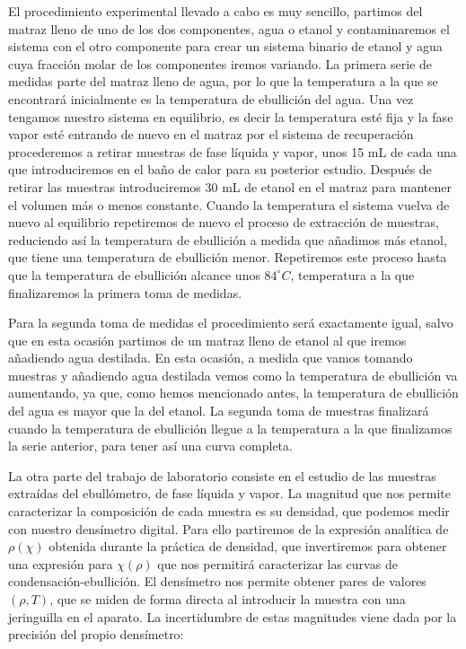 \documentclass[a4paper,12pt,titlepage]{article}
\begin{document}
El procedimiento experimental llevado a cabo es muy sencillo, partimos del matraz lleno de uno de los dos componentes, agua o etanol y contaminaremos el sistema con el otro componente para crear un sistema binario de etanol y agua cuya fracción molar de los componentes iremos variando. La primera serie de medidas parte del matraz lleno de agua, por lo que la temperatura a la que se encontrará inicialmente es la temperatura de ebullición del agua. Una vez tengamos nuestro sistema en equilibrio, es decir la temperatura esté fija y la fase vapor esté entrando de nuevo en el matraz por el sistema de recuperación procederemos a retirar muestras de fase líquida y vapor, unos 15 mL de cada una que introduciremos en el baño de calor para su posterior estudio. Después de retirar las muestras introduciremos 30 mL de etanol en el matraz para mantener el volumen más o menos constante. Cuando la temperatura el sistema vuelva de nuevo al equilibrio repetiremos de nuevo el proceso de extracción de muestras, reduciendo así la temperatura de ebullición a medida que añadimos más etanol, que tiene una temperatura de ebullición menor. Repetiremos este proceso hasta que la temperatura de ebullición alcance unos $84^{\circ} C$, temperatura a la que finalizaremos la primera toma de medidas.

Para la segunda toma de medidas el procedimiento será exactamente igual, salvo que en esta ocasión partimos de un matraz lleno de etanol al que iremos añadiendo agua destilada. En esta ocasión, a medida que vamos tomando muestras y añadiendo agua destilada vemos como la temperatura de ebullición va aumentando, ya que, como hemos mencionado antes, la temperatura de ebullición del agua es mayor que la del etanol. La segunda toma de muestras finalizará cuando la temperatura de ebullición llegue a la temperatura a la que finalizamos la serie anterior, para tener así una curva completa.

La otra parte del trabajo de laboratorio consiste en el estudio de las muestras extraídas del ebullómetro, de fase líquida y vapor. La magnitud que nos permite caracterizar la composición de cada muestra es su densidad, que podemos medir con nuestro densímetro digital. Para ello partiremos de la expresión analítica de $\rho(\chi)$ obtenida durante la práctica de densidad, que invertiremos para obtener una expresión para $\chi(\rho)$ que nos permitirá caracterizar las curvas de condensación-ebullición. El densímetro nos permite obtener pares de valores $(\rho,T)$, que se miden de forma directa al introducir la muestra con una jeringuilla en el aparato. La incertidumbre de estas magnitudes viene dada por la precisión del propio densímetro:
\end{document}
